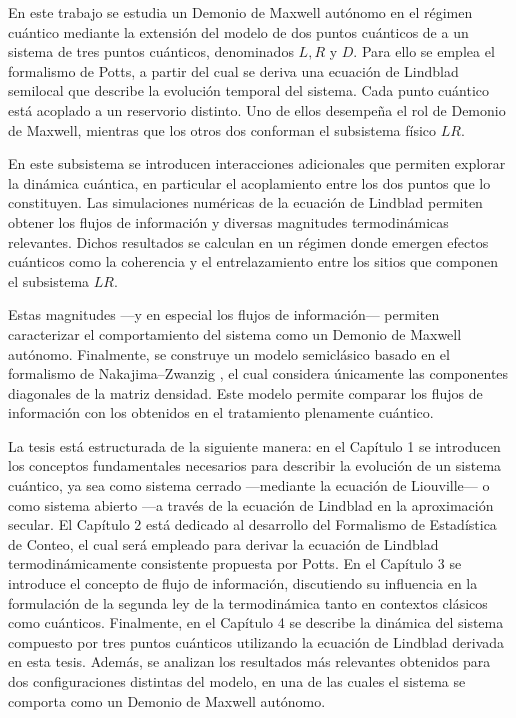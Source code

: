 En este trabajo se estudia un Demonio de Maxwell autónomo en el régimen cuántico mediante la extensión del modelo de dos puntos cuánticos de \cite{horowitz2014thermodynamics} a un sistema de tres puntos cuánticos, denominados $L,R$ y $D$. Para ello se emplea el formalismo de Potts, a partir del cual se deriva una ecuación de Lindblad semilocal que describe la evolución temporal del sistema. Cada punto cuántico está acoplado a un reservorio distinto. Uno de ellos desempeña el rol de Demonio de Maxwell, mientras que los otros dos conforman el subsistema físico $LR$.

En este subsistema se introducen interacciones adicionales que permiten explorar la dinámica cuántica, en particular el acoplamiento entre los dos puntos que lo constituyen. Las simulaciones numéricas de la ecuación de Lindblad permiten obtener los flujos de información y diversas magnitudes termodinámicas relevantes. Dichos resultados se calculan en un régimen donde emergen efectos cuánticos como la coherencia y el entrelazamiento entre los sitios que componen el subsistema $LR$.

Estas magnitudes ---y en especial los flujos de información--- permiten caracterizar el comportamiento del sistema como un Demonio de Maxwell autónomo. 
Finalmente, se construye un modelo semiclásico basado en el formalismo de Nakajima--Zwanzig \cite{zwanzig1966statistical}, el cual considera únicamente las componentes diagonales de la matriz densidad. Este modelo permite comparar los flujos de información con los obtenidos en el tratamiento plenamente cuántico.


La tesis está estructurada de la siguiente manera: en el Capítulo 1 se introducen los conceptos fundamentales necesarios para describir la evolución de un sistema cuántico, ya sea como sistema cerrado —mediante la ecuación de Liouville— o como sistema abierto —a través de la ecuación de Lindblad en la aproximación secular. El Capítulo 2 está dedicado al desarrollo del Formalismo de Estadística de Conteo, el cual será empleado para derivar la ecuación de Lindblad termodinámicamente consistente propuesta por Potts. En el Capítulo 3 se introduce el concepto de flujo de información, discutiendo su influencia en la formulación de la segunda ley de la termodinámica tanto en contextos clásicos como cuánticos. Finalmente, en el Capítulo 4 se describe la dinámica del sistema compuesto por tres puntos cuánticos utilizando la ecuación de Lindblad derivada en esta tesis. Además, se analizan los resultados más relevantes obtenidos para dos configuraciones distintas del modelo, en una de las cuales el sistema se comporta como un Demonio de Maxwell autónomo.





